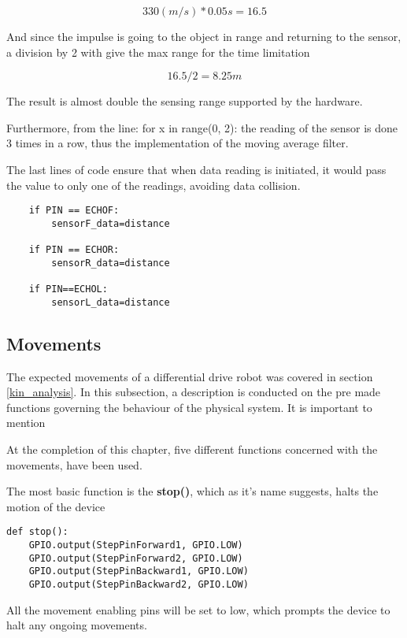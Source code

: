 \begin{equation}
330(m/s)*0.05s=16.5
\end{equation}

And since the impulse is going to the object in range and returning to the sensor, a division by 2 with give the max range for the time limitation 

\begin{equation}
16.5/2=8.25m
\end{equation}

The result is almost double the sensing range supported by the hardware. 

Furthermore, from the line: for x in range(0, 2): the reading of the sensor is done 3 times in a row, thus the implementation of the moving average filter.

The last lines of code ensure that when data reading is initiated, it would pass the value to only one of the readings, avoiding data collision.

\begin{lstlisting}
	if PIN == ECHOF:
		sensorF_data=distance

	if PIN == ECHOR:
		sensorR_data=distance

	if PIN==ECHOL:
		sensorL_data=distance

\end{lstlisting}

\subsection{Movements}

The expected movements of a differential drive robot was covered in section \ref{kin_analysis}. In this subsection, a description is conducted on the pre made functions governing the behaviour of the physical system. It is important to mention  
  
At the completion of this chapter, five different functions concerned with the movements, have been used.

The most basic function is the \textbf{stop()}, which as it's name suggests, halts the motion of the device

\begin{lstlisting}
def stop():
	GPIO.output(StepPinForward1, GPIO.LOW)
	GPIO.output(StepPinForward2, GPIO.LOW)
	GPIO.output(StepPinBackward1, GPIO.LOW)
	GPIO.output(StepPinBackward2, GPIO.LOW)
\end{lstlisting}

All the movement enabling pins will be set to low, which prompts the device to halt any ongoing movements. 

